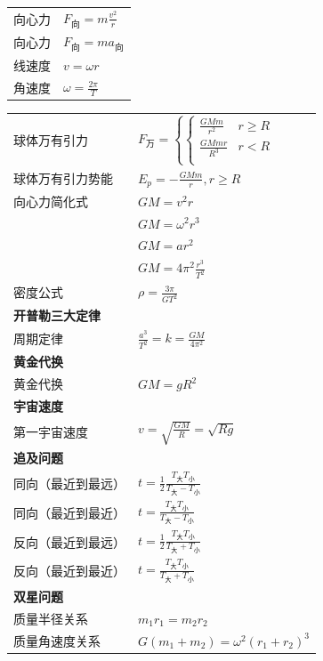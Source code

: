 \begin{tabularx}{\columnwidth}{XX}
  向心力 & $F_{\text{向}}=m\frac{v^2}{r}$ \\
  向心力 & $F_{\text{向}}=ma_{\text{向}}$ \\
  线速度 & $v=\omega r$ \\
  角速度 & $\omega=\frac{2\pi}{T}$ \\
\end{tabularx}
\medskip

\begin{tabularx}{\columnwidth}{XX}
  球体万有引力 & $ F_{\text{万}}=\left\{
    \begin{cases}
      \frac{GMm}{r^2}  & r\ge R \\
      \frac{GMmr}{R^3} & r<R    \\
    \end{cases}
  \right.$ \\
  球体万有引力势能 & $E_p=-\frac{GMm}{r},r\ge R$ \\
  向心力简化式 & $GM=v^2r$ \\
   & $GM=\omega^2r^3$ \\
   & $GM=ar^2$ \\
   & $GM=4\pi^2\frac{r^3}{T^2}$ \\
  密度公式 & $\rho=\frac{3\pi}{GT^2}$ \\
  \multicolumn{2}{l}{\textbf{开普勒三大定律}} \\
  周期定律 & $\frac{a^3}{T^2}=k=\frac{GM}{4\pi^2}$ \\
  \multicolumn{2}{l}{\textbf{黄金代换}} \\
  黄金代换 & $GM=gR^2$ \\
  \multicolumn{2}{l}{\textbf{宇宙速度}} \\
  第一宇宙速度 & $v=\sqrt{\frac{GM}{R}}=\sqrt{Rg}$ \\
  \multicolumn{2}{l}{\textbf{追及问题}} \\
  同向（最近到最远） & $t=\frac12\frac{T_{\text{大}}T_{\text{小}}}{T_{\text{大}}-T_{\text{小}}}$ \\
  同向（最近到最近） & $t=\frac{T_{\text{大}}T_{\text{小}}}{T_{\text{大}}-T_{\text{小}}}$ \\
  反向（最近到最远） & $t=\frac12\frac{T_{\text{大}}T_{\text{小}}}{T_{\text{大}}+T_{\text{小}}}$ \\
  反向（最近到最近） & $t=\frac{T_{\text{大}}T_{\text{小}}}{T_{\text{大}}+T_{\text{小}}}$ \\
  \multicolumn{2}{l}{\textbf{双星问题}} \\
  质量半径关系 & $m_1r_1=m_2r_2$ \\
  质量角速度关系 & $G(m_1+m_2)=\omega^2(r_1+r_2)^3$ \\
\end{tabularx}
\medskip

